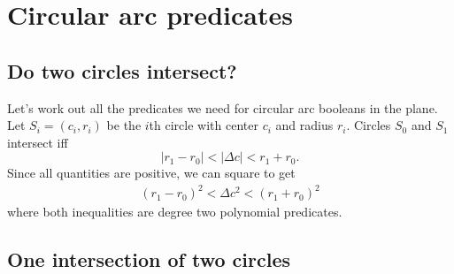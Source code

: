 \documentclass[11pt]{article}
\begin{document}
{\section{Circular arc predicates}

\subsection{Do two circles intersect?}

Let's work out all the predicates we need for circular arc booleans in the plane.  Let $S_i = (c_i,r_i)$ be the $i$th
circle with center $c_i$ and radius $r_i$.  Circles $S_0$ and $S_1$ intersect iff
$$ | r_1 - r_0 | < |\Delta c| < r_1 + r_0. $$
Since all quantities are positive, we can square to get
\begin{align} \label{two-circles}
(r_1 - r_0)^2 < \Delta c^2 < (r_1 + r_0)^2
\end{align}
where both inequalities are degree two polynomial predicates.

\subsection{One intersection of two circles}

}
\end{document}
